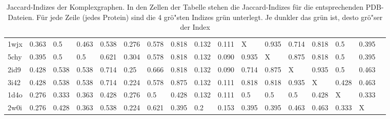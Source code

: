 \documentclass{report}
\begin{document}
\begin{table}
{\begin{tabular}{l l l l l l l l l l l l l l l l l}
1wjx & 0.363 & 0.5 & 0.463 & 0.538 & 0.276 & 0.578 & \cellcolor{fGreen!50}0.818 & 0.132 & 0.111 &   X   & \cellcolor{fGreen!100}0.935 & \cellcolor{fGreen!25}0.714 & \cellcolor{fGreen!75}0.818 & 0.5 & 0.395 &  \\
5chy & 0.395 & 0.5 & 0.5 & 0.621 & 0.304 & 0.578 & \cellcolor{fGreen!25}0.818 & 0.132 & 0.090 & \cellcolor{fGreen!100}0.935 &   X   & \cellcolor{fGreen!75}0.875 & \cellcolor{fGreen!50}0.818 & 0.5 & 0.395 &  \\
2id9 & 0.428 & 0.538 & 0.538 & 0.714 & 0.25 & 0.666 & \cellcolor{fGreen!50}0.818 & 0.132 & 0.090 & \cellcolor{fGreen!25}0.714 & \cellcolor{fGreen!75}0.875 &   X   & \cellcolor{fGreen!100}0.935 & 0.5 & 0.463 &  \\
3i42 & 0.428 & 0.538 & 0.538 & 0.714 & 0.224 & 0.578 & \cellcolor{fGreen!75}0.875 & 0.132 & 0.111 & \cellcolor{fGreen!25}0.818 & \cellcolor{fGreen!50}0.818 & \cellcolor{fGreen!100}0.935 &   X   & 0.428 & 0.463 &  \\
1d4o & 0.276 & 0.333 & 0.363 & 0.428 & 0.276 & \cellcolor{fGreen!100}0.5 & 0.428 & 0.132 & 0.111 & \cellcolor{fGreen!50}0.5 & \cellcolor{fGreen!25}0.5 & \cellcolor{fGreen!75}0.5 & 0.428 &   X   & 0.333 &  \\
2w0i & 0.276 & 0.428 & 0.363 & \cellcolor{fGreen!75}0.538 & 0.224 & \cellcolor{fGreen!100}0.621 & 0.395 & 0.2 & 0.153 & 0.395 & 0.395 & \cellcolor{fGreen!25}0.463 & \cellcolor{fGreen!50}0.463 & 0.333 &   X   &  \\

\end{tabular}}
\caption{Jaccard-Indizes der Komplexgraphen. In den Zellen der Tabelle stehen die Jaccard-Indizes f\"ur die entsprechenden PDB-Dateien. F\"ur jede Zeile (jedes Protein) sind die 4 gr\"o"sten Indizes gr\"un unterlegt. Je dunkler das gr\"un ist, desto gr\"o"ser der Index}
\end{table}





\end{document}
